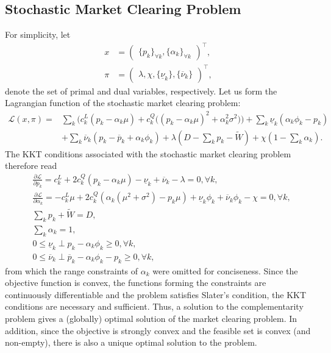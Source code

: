 \documentclass{article}
\begin{document}
\subsection*{Stochastic Market Clearing Problem}
For simplicity, let 
\begin{align*}
x &= \begin{pmatrix} \{p_k\}_{\forall k}, \{\alpha_k\}_{\forall k} \end{pmatrix}^\top,\\
\pi &= \begin{pmatrix} \lambda, \chi, \{\underline{\nu}_k\}, \{\overline{\nu}_k\} \end{pmatrix}^\top,
\end{align*}
denote the set of primal and dual variables, respectively. Let us form the Lagrangian function of the stochastic market clearing problem:
\begin{align*}
\mathcal{L}(x, \pi) =& \sum_k \Big(c_k^L(p_k - \alpha_k \mu) + c_k^Q \big((p_k - \alpha_k \mu)^2 + \alpha_k^2 \sigma^2\big)\Big) + \sum_k \underline{\nu}_k (\alpha_k \phi_k - p_k)\\
& + \sum_k \overline{\nu}_k (p_k - \overline{p}_k + \alpha_k \phi_k) + \lambda(D - \sum_k p_k - \tilde{W}) + \chi(1 - \sum_k \alpha_k).
\end{align*}
The KKT conditions associated with the stochastic market clearing problem therefore read
\begin{align*}
&\frac{\partial \mathcal{L}}{\partial p_k} = c_k^L + 2 c_k^Q (p_k - \alpha_k \mu) - \underline{\nu}_k + \overline{\nu}_k - \lambda = 0, \forall k,\\
&\frac{\partial \mathcal{L}}{\partial \alpha_k} = - c_k^L \mu + 2 c_k^Q(\alpha_k(\mu^2 + \sigma^2) - p_k \mu) + \underline{\nu}_k \phi_k + \overline{\nu}_k \phi_k  - \chi = 0, \forall k,\\
&\sum_k p_k + \tilde{W} = D,\\
&\sum_k \alpha_k = 1,\\
&0 \le \underline{\nu}_k \perp p_k - \alpha_k \phi_k \ge 0, \forall k,\\
&0 \le \overline{\nu}_k \perp \overline{p}_k -  \alpha_k \phi_k- p_k \ge 0, \forall k,
\end{align*}
from which the range constraints of $\alpha_k$ were omitted for conciseness. Since the objective function is convex, the functions forming the constraints are continuously differentiable and the problem satisfies Slater's condition, the KKT conditions are necessary and sufficient. Thus, a solution to the complementarity problem gives a (globally) optimal solution of the market clearing problem. In addition, since the objective is strongly convex and the feasible set is convex (and non-empty), there is also a unique optimal solution to the problem.
\end{document}
